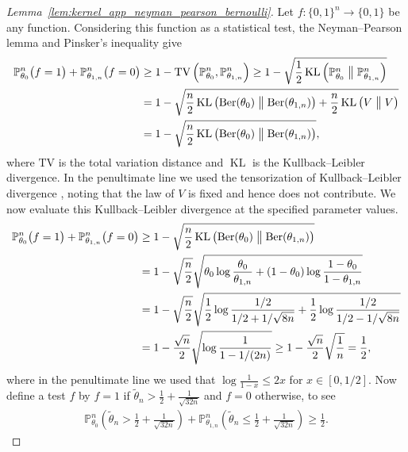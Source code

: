 \documentclass[11pt,lof]{puthesis}
\renewcommand{\P}{\ensuremath{\mathbb{P}}}
\newcommand{\TV}{\mathrm{TV}}
\DeclareMathOperator{\Ber}{Ber}
\DeclareMathOperator{\KL}{KL}
\theoremstyle{break}
\theoremstyle{proof}
\newtheorem{proof}{Proof}
\begin{document}
\begin{proof}[Lemma~\ref{lem:kernel_app_neyman_pearson_bernoulli}]

Let $f: \{0,1\}^n \to \{0,1\}$
be any function.
Considering this function as a statistical test,
the Neyman--Pearson lemma and Pinsker's inequality
\citep{gine2021mathematical}
give
%
\begin{align*}
\P_{\theta_0}^n \big(
f=1
\big)
+\P_{\theta_{1,n}}^n \big(
f=0
\big)
&\geq
1-
\TV\left(
\P_{\theta_0}^n,
\P_{\theta_{1,n}}^n
\right)
\geq
1-
\sqrt{
\frac{1}{2}
\KL \left(
\P_{\theta_0}^n
\bigm\|
\P_{\theta_{1,n}}^n
\right)} \\
&=
1-
\sqrt{
\frac{n}{2}
\KL \left(
\Ber(\theta_0)
\bigm\|
\Ber(\theta_{1,n})
\right)
+ \frac{n}{2}
\KL \left(
V
\bigm\|
V
\right)} \\
&=
1-
\sqrt{
\frac{n}{2}
\KL \left(
\Ber(\theta_0)
\bigm\|
\Ber(\theta_{1,n})
\right)},
\end{align*}
%
where $\TV$ is the total variation distance
and $\KL$ is the Kullback--Leibler divergence.
In the penultimate line
we used the tensorization of Kullback--Leibler divergence
\citep{gine2021mathematical},
noting that the law of $V$ is fixed and hence does not contribute.
We now evaluate this Kullback--Leibler divergence at the specified
parameter values.
%
\begin{align*}
\P_{\theta_0}^n \big(
f=1
\big)
+\P_{\theta_{1,n}}^n \big(
f=0
\big)
&\geq
1-
\sqrt{
\frac{n}{2}
\KL \left(
\Ber(\theta_0)
\bigm\|
\Ber(\theta_{1,n})
\right)} \\
&=
1-
\sqrt{\frac{n}{2}}
\sqrt{
\theta_0 \log \frac{\theta_0}{\theta_{1,n}}
+ (1 - \theta_0) \log \frac{1 - \theta_0}{1 - \theta_{1,n}}} \\
&=
1-
\sqrt{\frac{n}{2}}
\sqrt{
\frac{1}{2} \log \frac{1/2}{1/2 + 1/\sqrt{8n}}
+ \frac{1}{2} \log \frac{1/2}{1/2 - 1/\sqrt{8n}}} \\
&=
1-
\frac{\sqrt n}{2}
\sqrt{\log \frac{1}{1 - 1/(2n)}}
\geq
1-
\frac{\sqrt n}{2}
\sqrt{\frac{1}{n}}
=
\frac{1}{2},
\end{align*}
%
where in the penultimate line we used that
$\log \frac{1}{1-x} \leq 2x$
for $x \in [0,1/2]$.
Now define a test $f$ by
$f = 1$ if $\tilde \theta_n > \frac{1}{2} + \frac{1}{\sqrt{32n}}$
and $f=0$ otherwise,
to see
%
\begin{align*}
\P_{\theta_0}^n \left(
\tilde \theta_n > \frac{1}{2} + \frac{1}{\sqrt{32n}}
\right)
+ \P_{\theta_{1,n}}^n \left(
\tilde \theta_n \leq \frac{1}{2} + \frac{1}{\sqrt{32n}}
\right)
\geq \frac{1}{2}.
\end{align*}

\end{proof}
\end{document}
